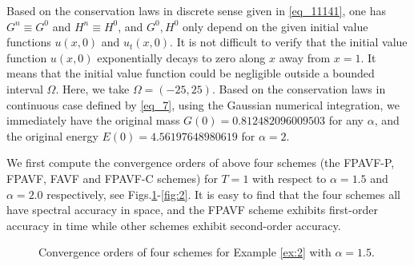 \documentclass[preprint,compress,3p,10pt,fleqn]{elsarticle}
\numberwithin{equation}{section}
\begin{document}

Based on the conservation laws in discrete sense given in \eqref{eq_11141}, one has $G^n\equiv G^0$ and $H^n\equiv H^0$, and $G^0, H^0$ only depend on the given initial value functions $u(x,0)$ and $u_t(x, 0)$.
It is not difficult to verify that the initial value function $u(x, 0)$ exponentially decays to zero along $x$ away from $x=1$. It means that
the initial value function could be negligible outside a bounded interval $\Omega$. %
Here, we take $\Omega=(-25,25)$.
Based on the conservation laws in continuous case defined by \eqref{eq_7}, using the Gaussian numerical integration, we immediately have the original mass $G(0)=0.812482096009503$ for any $\alpha$, and the original energy $E(0)=4.56197648980619$ for $\alpha=2$.

We first compute the convergence orders of above four schemes (the FPAVF-P, FPAVF, FAVF and FPAVF-C schemes) for $T=1$ with respect to $\alpha=1.5$ and $\alpha=2.0$ respectively, see Figs.\ref{fig:1}-\ref{fig:2}.
It is easy to find that the four schemes all have spectral accuracy in space, and the FPAVF scheme exhibits first-order accuracy in time while other schemes exhibit second-order accuracy.

\begin{figure}[H]
\begin{center}
\caption{Convergence orders of four schemes for Example \ref{ex:2} with $\alpha=1.5$.} \label{fig:1}
\end{center}
\end{figure}
\end{document}

